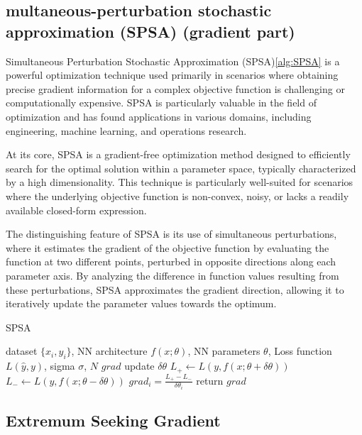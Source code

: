 \documentclass[nohyperref]{article}
\theoremstyle{plain}
\theoremstyle{definition}
\theoremstyle{remark}
\begin{document}
\subsection{multaneous-perturbation stochastic
approximation (SPSA) (gradient part)}
Simultaneous Perturbation Stochastic Approximation (SPSA)\cref{alg:SPSA} is a powerful optimization technique used primarily in scenarios where obtaining precise gradient information for a complex objective function is challenging or computationally expensive. SPSA is particularly valuable in the field of optimization and has found applications in various domains, including engineering, machine learning, and operations research.

At its core, SPSA is a gradient-free optimization method designed to efficiently search for the optimal solution within a parameter space, typically characterized by a high dimensionality. This technique is particularly well-suited for scenarios where the underlying objective function is non-convex, noisy, or lacks a readily available closed-form expression.

The distinguishing feature of SPSA is its use of simultaneous perturbations, where it estimates the gradient of the objective function by evaluating the function at two different points, perturbed in opposite directions along each parameter axis. By analyzing the difference in function values resulting from these perturbations, SPSA approximates the gradient direction, allowing it to iteratively update the parameter values towards the optimum.

\begin{algorithm}[tb]
   \caption{SPSA}
   \label{alg:SPSA}
\begin{algorithmic}
   dataset $\{x_{i},y_{i}\}$, NN architecture $f(x;\theta)$, NN parameters $\theta$, Loss function $L(\hat{y},y)$, sigma $\sigma$, $N$
   $grad$
  \STATE update $\delta \theta$
  \STATE $L_{+} \leftarrow L(y,f(x;\theta+\delta \theta))$
  \STATE $L_{-} \leftarrow L(y,f(x;\theta-\delta \theta))$
  \STATE $grad_{i} = \frac{L_{+}-L_{-}}{\delta\theta_{i}}$
  \STATE return $grad$

\end{algorithmic}
\end{algorithm}


\subsection{Extremum Seeking Gradient}
\end{document}
